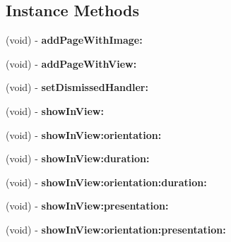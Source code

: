 \subsection*{Instance Methods}
\begin{DoxyCompactItemize}
\item 
\hypertarget{interface_t_x_s_a_d_view_ex_aa2d8e27091c93d85ffa7e543fe34b5d3}{}(void) -\/ {\bfseries add\+Page\+With\+Image\+:}\label{interface_t_x_s_a_d_view_ex_aa2d8e27091c93d85ffa7e543fe34b5d3}

\item 
\hypertarget{interface_t_x_s_a_d_view_ex_a6815522254d57fbd6fefaf358b2c4682}{}(void) -\/ {\bfseries add\+Page\+With\+View\+:}\label{interface_t_x_s_a_d_view_ex_a6815522254d57fbd6fefaf358b2c4682}

\item 
\hypertarget{interface_t_x_s_a_d_view_ex_ae5e68f1ec907374d2af53fa9a0cc00b2}{}(void) -\/ {\bfseries set\+Dismissed\+Handler\+:}\label{interface_t_x_s_a_d_view_ex_ae5e68f1ec907374d2af53fa9a0cc00b2}

\item 
\hypertarget{interface_t_x_s_a_d_view_ex_afce18c3ad9bdb0decc56deb60ab24c72}{}(void) -\/ {\bfseries show\+In\+View\+:}\label{interface_t_x_s_a_d_view_ex_afce18c3ad9bdb0decc56deb60ab24c72}

\item 
\hypertarget{interface_t_x_s_a_d_view_ex_a967a245914b593c49bb38bcc12cbaae0}{}(void) -\/ {\bfseries show\+In\+View\+:orientation\+:}\label{interface_t_x_s_a_d_view_ex_a967a245914b593c49bb38bcc12cbaae0}

\item 
\hypertarget{interface_t_x_s_a_d_view_ex_a0e0f457b42240f8f151888434f3a786c}{}(void) -\/ {\bfseries show\+In\+View\+:duration\+:}\label{interface_t_x_s_a_d_view_ex_a0e0f457b42240f8f151888434f3a786c}

\item 
\hypertarget{interface_t_x_s_a_d_view_ex_acf62543e8520514428dc32831ed6796a}{}(void) -\/ {\bfseries show\+In\+View\+:orientation\+:duration\+:}\label{interface_t_x_s_a_d_view_ex_acf62543e8520514428dc32831ed6796a}

\item 
\hypertarget{interface_t_x_s_a_d_view_ex_af64ed90d7309086bffbcff8fe57c962e}{}(void) -\/ {\bfseries show\+In\+View\+:presentation\+:}\label{interface_t_x_s_a_d_view_ex_af64ed90d7309086bffbcff8fe57c962e}

\item 
\hypertarget{interface_t_x_s_a_d_view_ex_af5578fce6b58d151e6c6603f30e5fae9}{}(void) -\/ {\bfseries show\+In\+View\+:orientation\+:presentation\+:}\label{interface_t_x_s_a_d_view_ex_af5578fce6b58d151e6c6603f30e5fae9}


\end{DoxyCompactItemize}
